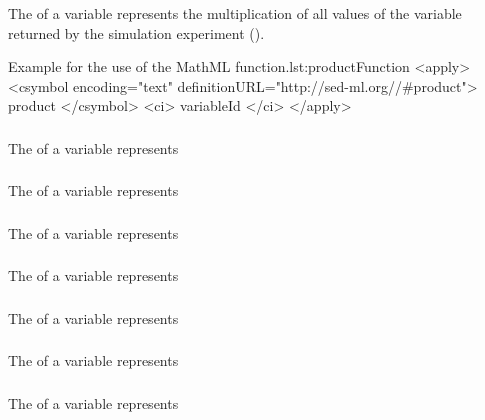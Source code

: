 \subsubsection*{}
\label{fun:product}
The  of a variable represents the multiplication of all values of the variable returned by the simulation experiment ().
\begin{myXmlLst}{Example for the use of the MathML  function.}{lst:productFunction}
<apply>
 	<csymbol encoding="text" definitionURL="http://sed-ml.org//#product">
 		product
 	</csymbol>
 	<ci> variableId </ci>
</apply>
\end{myXmlLst}

\subsubsection*{}
\label{fun:count}
The \sedcount of a variable represents 

\subsubsection*{}
\label{fun:mean}
The \mean of a variable represents 

\subsubsection*{}
\label{fun:stdev}
The \stdev of a variable represents 

\subsubsection*{}
\label{fun:variance}
The \variance of a variable represents 

\subsubsection*{}
\label{fun:uniform}
The \uniform of a variable represents 

\subsubsection*{}
\label{fun:normal}
The \normal of a variable represents 

\subsubsection*{}
\label{fun:lognormal}
The \lognormal of a variable represents 

